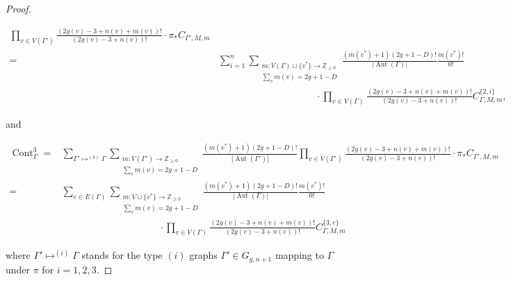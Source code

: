 \documentclass[12pt,reqno]{amsart}
\DeclareMathOperator{\Aut}{Aut}
\DeclareMathOperator{\Cont}{Cont}
\theoremstyle{plain}
\theoremstyle{definition}
\theoremstyle{remark}
\begin{document}
\begin{proof}
\begin{small}
\begin{align*}
    \prod_{v \in V(\Gamma')} \frac{(2g(v) - 3 + n(v) + m(v))!}{(2g(v) - 3 + n(v))!} \cdot \pi_*C_{\Gamma', M, m}
\\=&
\sum_{i=1}^{n}\sum_{\substack{m\colon V(\Gamma)\sqcup \{v^*\}\rightarrow\mathbb{Z}_{\geq0}\\ \sum_{v}m(v)=2g+1-D}}\frac{(m(v^*) + 1)(2g + 1 - D)!}{|\Aut(\Gamma)|}
 \frac{m(v^*)!}{0!}   
\\&\hspace{120pt}\cdot\prod_{v \in V(\Gamma)} \frac{(2g(v) - 3 + n(v) + m(v))!}{(2g(v) - 3 + n(v))!}C^{\{2,i\}}_{\Gamma,M,m},
\end{align*}    
\end{small}
and
\begin{small}
  \begin{align*}
    \Cont_\Gamma^3 =
&
\sum_{\Gamma'\mapsto^{(3)} \Gamma}\sum_{\substack{m\colon V(\Gamma') \to \mathbb Z_{\ge 0} \\ \sum_v m(v) = 2g + 1 - D}}
    \frac{(m(v^*) + 1)(2g + 1 - D)!}{|\Aut(\Gamma')|}
    \prod_{v \in V(\Gamma')} \frac{(2g(v) - 3 + n(v) + m(v))!}{(2g(v) - 3 + n(v))!} \cdot \pi_*C_{\Gamma', M, m}
\\=&
    \sum_{e\in E(\Gamma)}\sum_{\substack{m\colon V\sqcup \{v^*\}\rightarrow\mathbb{Z}_{\geq0}\\ \sum_{v}m(v)=2g+1-D}}\frac{(m(v^*) + 1)(2g + 1 - D)!}{|\Aut(\Gamma)|}
    \frac{m(v^*)!}{0!}\\&\hspace{120pt}\cdot\prod_{v \in V(\Gamma)} \frac{(2g(v) - 3 + n(v) + m(v))!}{(2g(v) - 3 + n(v))!}C^{\{3,e\}}_{\Gamma,M,m}
\end{align*}    
\end{small}
where $\Gamma'\mapsto^{(i)}\Gamma$ stands for the type $(i)$ graphs $\Gamma' \in G_{g, n+1}$ mapping to $\Gamma$ under $\pi$ for $i=1,2,3$.
\end{proof}

\end{document}
